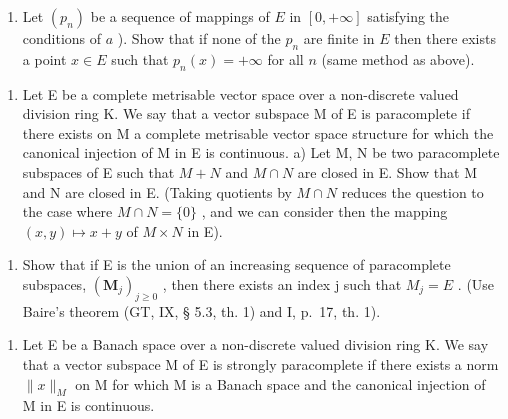 \begin{enumerate}
\def\labelenumi{\alph{enumi})}
\setcounter{enumi}{1}
\tightlist
\item
  Let \((p_n)\) be a sequence of mappings of \(E\) in \([0, +\infty]\) satisfying the conditions of \(a\) ). Show that if none of the \(p_n\) are finite in \(E\) then there exists a point \(x \in E\) such that \(p_n(x) = +\infty\) for all \(n\) (same method as above).
\end{enumerate}

\begin{enumerate}
\def\labelenumi{\arabic{enumi})}
\setcounter{enumi}{6}
\tightlist
\item
  Let E be a complete metrisable vector space over a non-discrete valued division ring K. We say that a vector subspace M of E is paracomplete if there exists on M a complete metrisable vector space structure for which the canonical injection of M in E is continuous. a) Let M, N be two paracomplete subspaces of E such that \(M + N\) and \(M \cap N\) are closed in E. Show that M and N are closed in E. (Taking quotients by \(M \cap N\) reduces the question to the case where \(M \cap N = \{0\}\) , and we can consider then the mapping \((x, y) \mapsto x + y\) of \(M \times N\) in E).
\end{enumerate}

\begin{enumerate}
\def\labelenumi{\alph{enumi})}
\setcounter{enumi}{1}
\tightlist
\item
  Show that if E is the union of an increasing sequence of paracomplete subspaces, \((\mathbf{M}_{j})_{j\geq0}\) , then there exists an index j such that \(M_{j}=E\) . (Use Baire's theorem (GT, IX, § 5.3, th. 1) and I, p.~17, th. 1).
\end{enumerate}

\begin{enumerate}
\def\labelenumi{\arabic{enumi})}
\setcounter{enumi}{7}
\tightlist
\item
  Let E be a Banach space over a non-discrete valued division ring K. We say that a vector subspace M of E is strongly paracomplete if there exists a norm \(\|x\|_{M}\) on M for which M is a Banach space and the canonical injection of M in E is continuous.
\end{enumerate}

